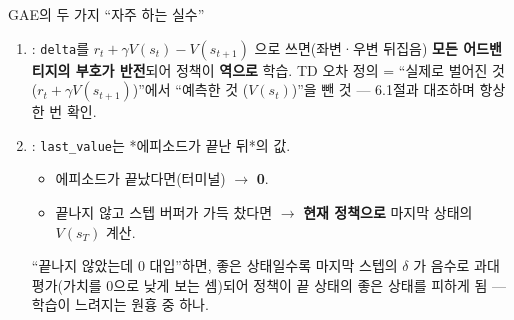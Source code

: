 \begin{frame}{GAE의 두 가지 ``자주 하는 실수''}
  \small
  \begin{enumerate}
    \item {}: \texttt{delta}를
      $r_t+\gamma V(s_t)-V(s_{t+1})$ 으로 쓰면(좌변·우변
      뒤집음) \textbf{모든 어드밴티지의 부호가 반전}되어
      정책이 \textbf{역으로} 학습.
      \smallskip
      {\footnotesize TD 오차 정의 = ``실제로 벌어진 것
      ($r_t+\gamma V(s_{t+1})$)''에서 ``예측한 것
      ($V(s_t)$)''을 뺀 것 — 6.1절과 대조하며 항상 한 번
      확인.}
    \item {}:
      \texttt{last\_value}는 *에피소드가 끝난 뒤*의 값.
      \begin{itemize}
        \item 에피소드가 끝났다면(터미널) $\to$ \textbf{0}.
        \item 끝나지 않고 스텝 버퍼가 가득 찼다면 $\to$
          \textbf{현재 정책으로} 마지막 상태의 $V(s_T)$ 계산.
      \end{itemize}
      ``끝나지 않았는데 0 대입''하면, 좋은 상태일수록 마지막
      스텝의 $\delta$ 가 음수로 과대평가(가치를 0으로 낮게
      보는 셈)되어 정책이 끝 상태의 좋은 상태를 피하게 됨 —
      학습이 느려지는 원흉 중 하나.
  \end{enumerate}
\end{frame}
